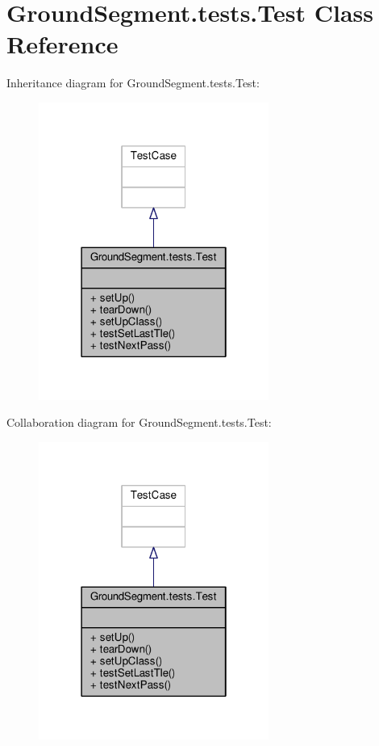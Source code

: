 \hypertarget{class_ground_segment_1_1tests_1_1_test}{}\section{Ground\+Segment.\+tests.\+Test Class Reference}
\label{class_ground_segment_1_1tests_1_1_test}


Inheritance diagram for Ground\+Segment.\+tests.\+Test\+:\nopagebreak
\begin{figure}[H]
\begin{center}
\leavevmode
\includegraphics[width=214pt]{class_ground_segment_1_1tests_1_1_test__inherit__graph}
\end{center}
\end{figure}


Collaboration diagram for Ground\+Segment.\+tests.\+Test\+:\nopagebreak
\begin{figure}[H]
\begin{center}
\leavevmode
\includegraphics[width=214pt]{class_ground_segment_1_1tests_1_1_test__coll__graph}
\end{center}
\end{figure}
